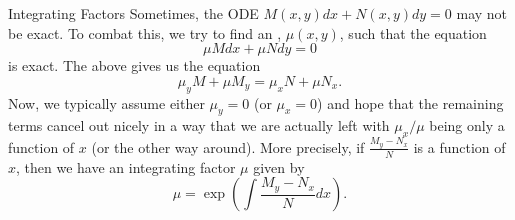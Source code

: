 \documentclass[dvipsnames, handout]{beamer}
\theoremstyle{definition}
\begin{document}
\begin{frame}{Integrating Factors}
  Sometimes, the ODE $M(x, y) dx + N(x, y) dy = 0$ may not be exact. \pause To combat this, we try to find an , \pause $\mu(x, y)$, \pause such that the equation
  \begin{equation*} 
    \mu M dx + \mu N dy = 0
  \end{equation*}
  is exact. \pause The above gives us the equation
  \begin{equation*} 
    \mu_{y} M + \mu M_{y} = \mu_{x} N + \mu N_{x}.
  \end{equation*} \pause
  Now, we typically assume either $\mu_{y} = 0$ (or $\mu_{x} = 0$) and hope that the remaining terms cancel out nicely in a way that we are actually left with $\mu_{x}/\mu$ being only a function of $x$ (or the other way around). \pause More precisely, if $\frac{M_{y} - N_{x}}{N}$ is a function of $x$, \pause then we have an integrating factor $\mu$ given by
  \begin{equation*} 
    \mu = \exp\left(\int \frac{M_{y} - N_{x}}{N} dx\right).
  \end{equation*}
\end{frame}
\end{document}
